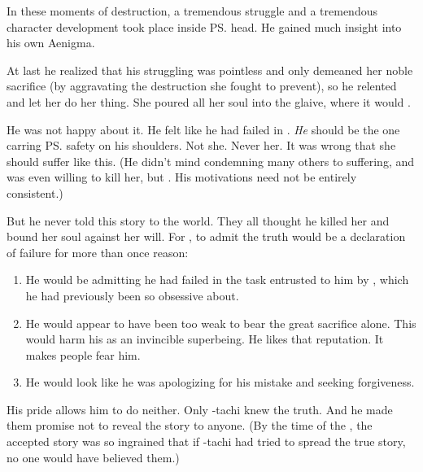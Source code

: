 In these moments of destruction, a tremendous struggle and a tremendous character development took place inside \ps{\Ishnaruchaefir} head. 
He gained much insight into his own Aenigma. 


At last he realized that his struggling was pointless and only demeaned her noble sacrifice (by aggravating the destruction she fought to prevent), so he relented and let her do her thing. 
She poured all her soul into the glaive, where it would . 

He was not happy about it. 
He felt like he had failed in .
\emph{He} should be the one carring \ps{\Miith} safety on his shoulders. 
Not she. 
Never her. 
It was wrong that she should suffer like this. 
(He didn't mind condemning many others to suffering, and was even willing to kill her, but . 
His motivations need not be entirely consistent.) 

But he never told this story to the world. 
They all thought he killed her and bound her soul against her will. 
For \Ishnaruchaefir, to admit the truth would be a declaration of failure for more than once reason:

\begin{enumerate}
  \item 
    He would be admitting he had failed in the task entrusted to him by \Nexagglachel, which he had previously been so obsessive about.
  \item 
    He would appear to have been too weak to bear the great sacrifice alone. 
    This would harm his  as an invincible superbeing. 
    He likes that reputation. 
    It makes people fear him. 
  \item 
    He would look like he was apologizing for his mistake and seeking forgiveness. 
\end{enumerate}

His pride allows him to do neither. 
Only \Criseis-tachi knew the truth. 
And he made them promise not to reveal the story to anyone. 
(By the time of the \thirdbanewar, the accepted story was so ingrained that if \Criseis-tachi had tried to spread the true story, no one would have believed them.)


